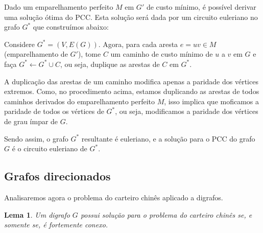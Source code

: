 \documentclass[12pt, a4paper]{article}
\newtheorem{lemma}{Lema}
\begin{document}
Dado um emparelhamento perfeito $M$ em $G'$ de custo mínimo, é possível derivar uma solução ótima do PCC. Esta solução será dada por um circuito euleriano no grafo $G^*$ que construímos abaixo:

Considere $G^* = (V, E(G))$. Agora, para cada aresta $e = uv \in M$ (emparelhamento de $G'$), tome $C$ um caminho de custo mínimo de $u$ a $v$ em $G$ e faça $G^* \leftarrow G^* \cup C$, ou seja, duplique as arestas de $C$ em $G^*$.

A duplicação das arestas de um caminho modifica apenas a paridade dos vértices extremos.
Como, no procedimento acima, estamos duplicando as arestas de todos caminhos derivados do emparelhamento perfeito $M$, isso implica que moficamos a paridade de todos os vértices de $G^*$, ou seja, modificamos a paridade dos vértices de grau ímpar de $G$.

Sendo assim, o grafo $G^*$ resultante é euleriano, e a solução para o PCC do grafo $G$ é o circuito euleriano de $G^*$.




    \subsection{Grafos direcionados}

    Analisaremos agora o problema do carteiro chinês aplicado a digrafos.

    \begin{lemma}
        Um digrafo $G$ possui solução para o problema do carteiro chinês se, e somente se, é fortemente conexo.
    \end{lemma}
\end{document}
